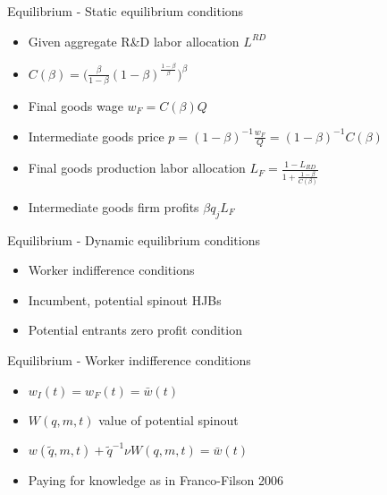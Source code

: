 \documentclass[english,usenames,dvipsnames]{beamer}
\begin{document}
\begin{frame}{Equilibrium - Static equilibrium conditions}
\begin{itemize}
	\item Given aggregate R\&D labor allocation $L^{RD}$
	\item $C(\beta) = \Big(\frac{\beta}{1-\beta} (1-\beta)^{\frac{1-\beta}{\beta}} \Big)^{\beta}$ 
	\item Final goods wage $w_F = C(\beta) Q$
	\item Intermediate goods price $p = (1-\beta)^{-1} \frac{w_F}{Q} = (1-\beta)^{-1} C(\beta)$
	\item Final goods production labor allocation $L_F = \frac{1 - L_{RD}}{1 + \frac{1-\beta}{C(\beta)}}$
	\item Intermediate goods firm profits $\beta q_j L_F$
\end{itemize}
\end{frame}

\begin{frame}{Equilibrium - Dynamic equilibrium conditions}
\begin{itemize}
	\item Worker indifference conditions
	\item Incumbent, potential spinout HJBs
	\item Potential entrants zero profit condition
\end{itemize}
\end{frame}

\begin{frame}{Equilibrium - Worker indifference conditions}
\begin{itemize}
	\item $w_I(t) = w_F(t) = \bar{w}(t)$
	\item $W(q,m,t)$ value of potential spinout
	\item $w(\tilde{q},m,t) + \tilde{q}^{-1} \nu W(q,m,t) = \bar{w}(t)$
	\item \alert{Paying for knowledge} as in Franco-Filson 2006
\end{itemize}
\end{frame}
\end{document}
